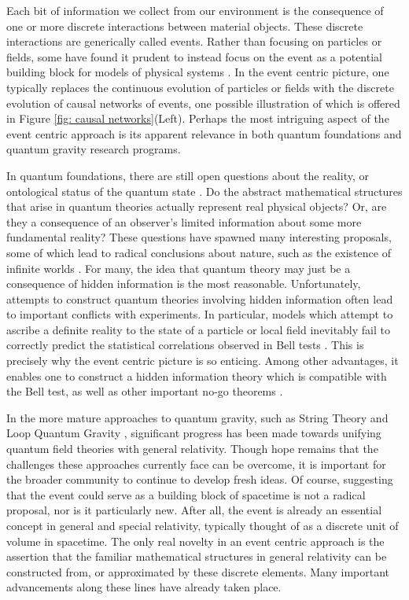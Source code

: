 \documentclass{article}
\begin{document}
 Each bit of information we collect from our environment is the consequence of one or more discrete interactions between material objects. These discrete interactions are generically called events. Rather than focusing on particles or fields, some have found it prudent to instead focus on the event as a potential building block for models of physical systems \cite{rovelli2021, Haag1990, froehlich2019, Drossel2018, morgan2022, DeRaedt2012, Giovannetti2023, Cortes2014, Markopoulou1997_2, Loll2019,  Surya2019}. In the event centric picture, one typically replaces the continuous evolution of particles or fields with the discrete evolution of causal networks of events, one possible illustration of which is offered in Figure \ref{fig: causal networks}(Left). Perhaps the most intriguing aspect of the event centric approach is its apparent relevance in both quantum foundations and quantum gravity research programs. 

 In quantum foundations, there are still open questions about the reality, or ontological status of the quantum state \cite{Leifer2014, bacciagaluppi2009}. Do the abstract mathematical structures that arise in quantum theories actually represent real physical objects? Or, are they a consequence of an observer's limited information about some more fundamental reality? These questions have spawned many interesting proposals, some of which lead to radical conclusions about nature, such as the existence of infinite worlds \cite{DeWitt1973}. For many, the idea that quantum theory may just be a consequence of hidden information is the most reasonable. Unfortunately, attempts to construct quantum theories involving hidden information often lead to important conflicts with experiments. In particular, models which attempt to ascribe a definite reality to the state of a particle or local field inevitably fail to correctly predict the statistical correlations observed in Bell tests \cite{Bell1964, Clauser1969}. This is precisely why the event centric picture is so enticing. Among other advantages, it enables one to construct a hidden information theory which is compatible with the Bell test, as well as other important no-go theorems \cite{Kochen1968, Pusey2012}.  

 In the more mature approaches to quantum gravity, such as String Theory \cite{Mukhi2011} and Loop Quantum Gravity \cite{Ashtekar2021}, significant progress has been made towards unifying quantum field theories with general relativity. Though hope remains that the challenges these approaches currently face can be overcome, it is important for the broader community to continue to develop fresh ideas. Of course, suggesting that the event could serve as a building block of spacetime is not a radical proposal, nor is it particularly new. After all, the event is already an essential concept in general and special relativity, typically thought of as a discrete unit of volume in spacetime. The only real novelty in an event centric approach is the assertion that the familiar mathematical structures in general relativity can be constructed from, or approximated by these discrete elements. Many important advancements along these lines have already taken place.
\end{document}
